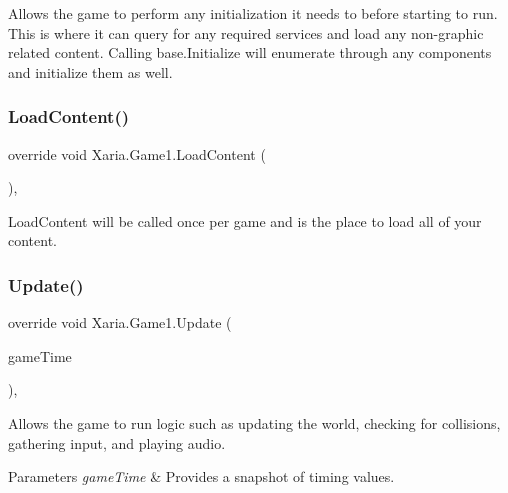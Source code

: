 Allows the game to perform any initialization it needs to before starting to run. This is where it can query for any required services and load any non-\/graphic related content. Calling base.\+Initialize will enumerate through any components and initialize them as well. 

\mbox{\label{classXaria_1_1Game1_a4593eda6c63d3242f6544e2357a08431}} 
\subsubsection{\texorpdfstring{Load\+Content()}{LoadContent()}}
{\footnotesize\ttfamily override void Xaria.\+Game1.\+Load\+Content (\begin{DoxyParamCaption}{ }\end{DoxyParamCaption})\hspace{0.3cm}{\ttfamily [inline]}, {\ttfamily [protected]}}



Load\+Content will be called once per game and is the place to load all of your content. 

\mbox{\label{classXaria_1_1Game1_a650e782700008533feec6ae84c19536a}} 
\subsubsection{\texorpdfstring{Update()}{Update()}}
{\footnotesize\ttfamily override void Xaria.\+Game1.\+Update (\begin{DoxyParamCaption}\item[{Game\+Time}]{game\+Time }\end{DoxyParamCaption})\hspace{0.3cm}{\ttfamily [inline]}, {\ttfamily [protected]}}



Allows the game to run logic such as updating the world, checking for collisions, gathering input, and playing audio. 


\begin{DoxyParams}{Parameters}
{\em game\+Time} & Provides a snapshot of timing values.\\
\hline
\end{DoxyParams}


